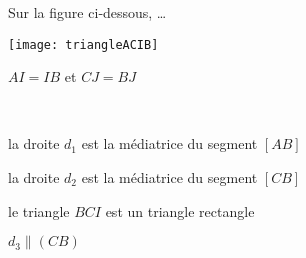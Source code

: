 \begin{QCM}
\begin{GroupeQCM}
    \begin{exercice}
      Sur la figure ci‑dessous, \ldots
      
     \begin{minipage}[c]{0.32\textwidth}
     \quad \texttt{[image: triangleACIB]}
     \end{minipage} \hfill%
     \begin{minipage}[c]{0.66\textwidth}
     $AI = IB$ et $CJ = BJ$
     \end{minipage} \\
      
      \begin{ChoixQCM}{4}
      \item la droite $d_1$ est la médiatrice du segment $[AB]$
      \item la droite $d_2$ est la médiatrice du segment $[CB]$
      \item le triangle $BCI$ est un triangle rectangle
      \item $d_3 \parallel (CB)$
      \end{ChoixQCM}
\begin{corrige}
   \end{corrige}
    \end{exercice}
    

\end{GroupeQCM}
\end{QCM}

  